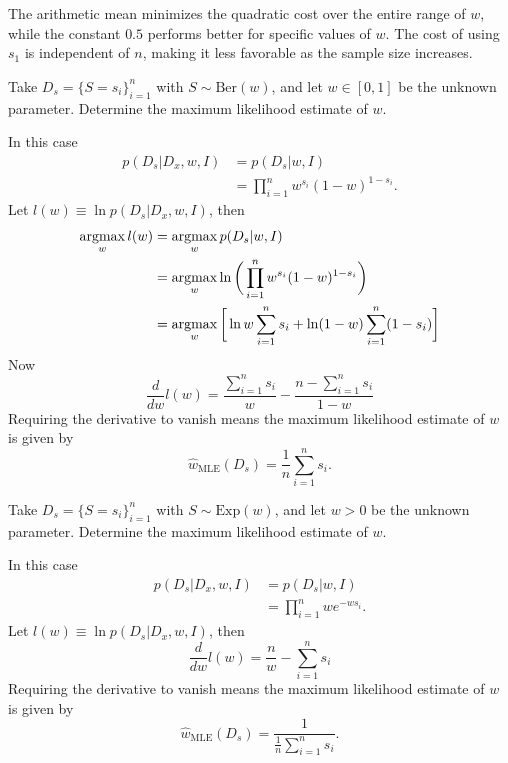 \begin{example}
	The arithmetic mean minimizes the quadratic cost over the entire range of $w$, while the constant $0.5$ performs better for specific values of $w$. The cost of using $s_1$ is independent of $n$, making it less favorable as the sample size increases.
\end{example}


\begin{example}
	Take $D_s= \{S= s_i\}_{i=1}^n$ with $S\sim \mathrm{Ber}(w)$, and let $w\in [0,1]$ be the unknown parameter. Determine the maximum likelihood estimate of $w$.\newline
	
	\noindent In this case
	\begin{equation}
		\begin{split}
			p(D_s|D_x,w,I) & =p(D_s|w,I)\\
			& = \prod_{i=1}^nw^{s_i}(1-w)^{1-s_i}.
		\end{split}
	\end{equation}
	Let $l(w)\equiv \ln p(D_s|D_x,w,I)$, then
	\begin{equation}
		\begin{split}
			\operatorname*{argmax}_wl(w) & = \operatorname*{argmax}_wp(D_s|w,I)\\
			&= \operatorname*{argmax}_w\ln \bigg(\prod_{i=1}^nw^{s_i}(1-w)^{1-s_i}\bigg)\\
			&=\operatorname*{argmax}_w \bigg[\ln w\sum_{i=1}^ns_i + \ln(1-w)\sum_{i=1}^n(1-s_i)\bigg]
		\end{split}
	\end{equation}
	Now 
	\begin{equation}
		\frac{d}{dw}l(w)=\frac{\sum_{i=1}^ns_i}{w}-\frac{n-\sum_{i=1}^ns_i}{1-w}
	\end{equation}
	Requiring the derivative to vanish means the maximum likelihood estimate of $w$ is given by
	\begin{equation}
		\hat{w}_{\text{MLE}}(D_s)=\frac{1}{n}\sum_{i=1}^ns_i.
	\end{equation}
\end{example}
\begin{example}
	Take $D_s= \{S = s_i\}_{i=1}^n$ with $S\sim \mathrm{Exp}(w)$, and let $w> 0$ be the unknown parameter. Determine the maximum likelihood estimate of $w$.\newline
	
	\noindent In this case
	\begin{equation}
		\begin{split}
			p(D_s|D_x,w,I)& =p(D_s|w,I)\\
			& =\prod_{i=1}^nw e^{-w s_i}.
		\end{split}
	\end{equation}
	Let $l(w)\equiv \ln p(D_s|D_x,w,I)$, then
	\begin{equation}
		\frac{d}{dw}l(w)=\frac{n}{w}-\sum_{i=1}^ns_i
	\end{equation}
	Requiring the derivative to vanish means the maximum likelihood estimate of $w$ is given by
	\begin{equation}
		\hat{w}_{\text{MLE}}(D_s)=\frac{1}{\frac{1}{n}\sum_{i=1}^ns_i}.
	\end{equation}
\end{example}

